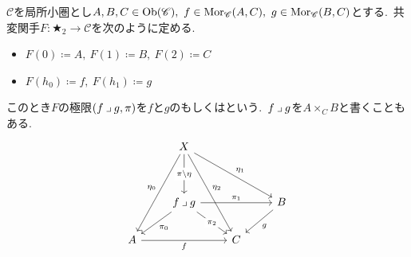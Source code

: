 \begin{definition} \label{def: pullback}
$\mathscr{C}$を局所小圏とし$A, B, C \in \operatorname{Ob}(\mathscr{C}),\ f \in \operatorname{Mor}_{\mathscr{C}}(A, C),\ g \in \operatorname{Mor}_{\mathscr{C}}(B, C)$とする.\
共変関手$F \colon \bigstar_2 \to \mathscr{C}$を次のように定める.\
\begin{itemize}
	\item $F(0) \coloneq A,\ F(1) \coloneq B,\ F(2) \coloneq C$
	\item $F(h_0) \coloneq f,\ F(h_1) \coloneq g$
\end{itemize}
このとき$F$の極限$(f \mathbin{\lrcorner} g, \pi)$を$f$と$g$のもしくはという.\
$f \mathbin{\lrcorner} g$を$A \times_C B$と書くこともある.\
\[\begin{tikzcd}
	& X && \\
	\\
	& {f \pb g} && B \\
	A && C
	\arrow["{\pi \backslash \eta}"{description}, from=1-2, to=3-2]
	\arrow["{\eta_1}", from=1-2, to=3-4]
	\arrow["{\eta_0}"', from=1-2, to=4-1]
	\arrow["{\eta_2}", from=1-2, to=4-3]
	\arrow["{\pi_1}", from=3-2, to=3-4]
	\arrow["{\pi_0}", from=3-2, to=4-1]
	\arrow["{\pi_2}"{description}, from=3-2, to=4-3]
	\arrow["g", from=3-4, to=4-3]
	\arrow["f"', from=4-1, to=4-3]
\end{tikzcd}\]
\Interactive{pullback}
\end{definition}

